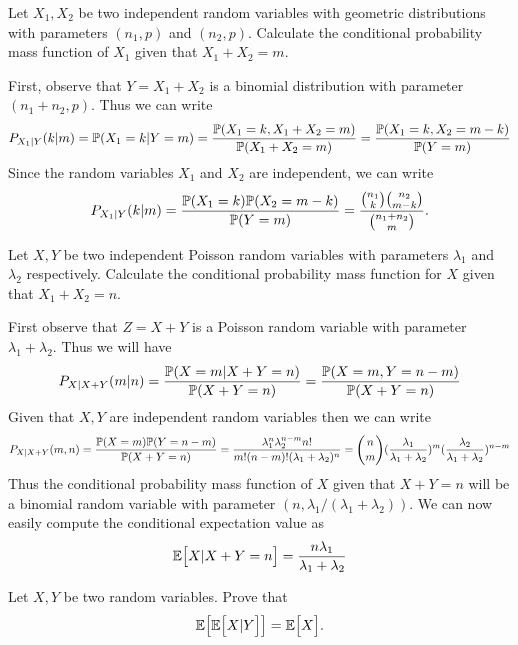 \begin{problem}
	Let $ X_1,X_2 $ be two independent random variables with geometric distributions with parameters $ (n_1,p) $ and $ (n_2,p) $. Calculate the conditional probability mass function of $ X_1 $ given that $ X_1+X_2 = m $.
\end{problem}
\begin{solution}
	First, observe that $ Y = X_1 + X_2 $ is a binomial distribution with parameter $ (n_1+n_2, p) $. Thus we can write
	\[ P_{X_1|Y}(k|m) = \mathbb{P}(X_1 = k | Y = m) = \frac{\mathbb{P}(X_1 = k, X_1+X_2 = m)}{\mathbb{P}(X_1+X_2 = m)} = \frac{\mathbb{P}(X_1=k, X_2 = m-k)}{\mathbb{P}(Y = m)} \]
	Since the random variables $ X_1 $ and $ X_2 $ are independent, we can write
	\[ P_{X_1|Y}(k|m) = \frac{\mathbb{P}(X_1=k)\mathbb{P}(X_2 = m-k)}{\mathbb{P}(Y=m)} = \frac{\binom{n_1}{k}\binom{n_2}{m-k}}{\binom{n_1+n_2}{m}}. \]
\end{solution}

\begin{problem}
	Let $ X,Y $ be two independent Poisson random variables with parameters $ \lambda_1 $ and $ \lambda_2 $ respectively. Calculate the conditional probability mass function for $ X $ given that $ X_1 + X_2 = n $.
\end{problem}
\begin{solution}
	First observe that $ Z = X + Y $ is a Poisson random variable with parameter $ \lambda_1 + \lambda_2 $. Thus we will have
	\[ P_{X|X+Y}(m|n) = \frac{\mathbb{P}(X=m|X+Y=n)}{\mathbb{P}(X+Y = n)} = \frac{\mathbb{P}(X=m,Y=n-m)}{\mathbb{P}(X+Y = n)} \]
	Given that $ X,Y $ are independent random variables then we can write
	\[ P_{X|X+Y}(m,n) = \frac{\mathbb{P}(X=m)\mathbb{P}(Y=n-m)}{\mathbb{P}(X+Y=n)} = \frac{\lambda_1^n \lambda_2^{n-m}n!}{m!(n-m)!(\lambda_1+\lambda_2)^n} = \binom{n}{m} (\frac{\lambda_1}{\lambda_1+\lambda_2})^m ( \frac{\lambda_2}{\lambda_1+\lambda_2})^{n-m} \]
	Thus the conditional probability mass function of $ X $ given that $ X+Y = n $ will be a binomial random variable with parameter $ (n,\lambda_1/(\lambda_1+\lambda_2)) $. We can now easily compute the conditional expectation value as
	\[ \mathbb{E}\big[X|X+Y = n\big] = \frac{n\lambda_1}{\lambda_1 + \lambda_2} \]
\end{solution}

\begin{problem}
	Let $ X,Y $ be two random variables. Prove that 
	\[ \mathbb{E}\big[\mathbb{E}\big[X|Y\big]\big] = \mathbb{E}\big[X\big]. \]
\end{problem}